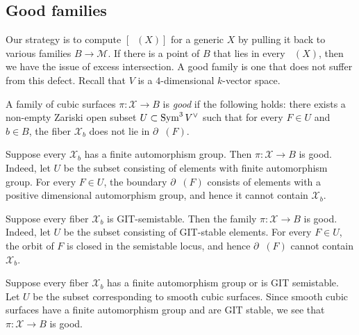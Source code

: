 \documentclass[12pt,reqno]{amsart}
\renewcommand{\k}{k}
\DeclareMathOperator{\Orb}{\overline{Orb}}
\renewcommand{\to}{{\longrightarrow}}
\numberwithin{equation}{section}
\newcommand{\cX}{\mathcal{X}}
\begin{document}
\subsection{Good families}
\label{sec:good-families}
Our strategy is to compute $[\Orb(X)]$ for a generic $X$ by pulling it back to various families $B \to \mathscr M$.
If there is a point of $B$ that lies in every $\Orb(X)$, then we have the issue of excess intersection. 
A good family is one that does not suffer from this defect.
Recall that $V$ is a $4$-dimensional $\k$-vector space.
\begin{definition}
\label{def:goodfamily}
A family of cubic surfaces $\pi \colon \cX \to B$ is \emph{good} if
the following holds: there exists a non-empty Zariski open subset
$U \subset \operatorname{Sym}^3V^\vee$ such that for every $F \in U$ and $b \in B$,
the fiber $\cX_b$ does not lie in $\partial \Orb(F)$.
\end{definition}
\begin{example}
  \label{ex:finaut}
  Suppose every $\cX_b$ has a finite automorphism group.  Then
  $\pi \colon \cX \to B$ is good.  Indeed, let $U$ be the subset
  consisting of elements with finite automorphism group.  For every
  $F \in U$, the boundary $\partial \Orb(F)$ consists of elements with
  a positive dimensional automorphism group, and hence it cannot
  contain $\cX_b$.
\end{example}
\begin{example}
  \label{ex:semistable}
  Suppose every fiber $\cX_b$ is GIT-semistable.
  Then the family $\pi \colon \cX \to B$ is good.
  Indeed, let $U$ be the subset consisting of GIT-stable elements.
  For every $F \in U$, the orbit of $F$ is closed in the semistable locus, and hence $\partial \Orb(F)$ cannot contain $\cX_b$.
\end{example}
\begin{example}[A combination]
  Suppose every fiber $\cX_b$ has a finite automorphism group or is GIT semistable.
  Let $U$ be the subset corresponding to smooth cubic surfaces.
  Since smooth cubic surfaces have a finite automorphism group and are GIT stable, we see that $\pi \colon \mathcal X \to B$ is good.
\end{example}
\end{document}
